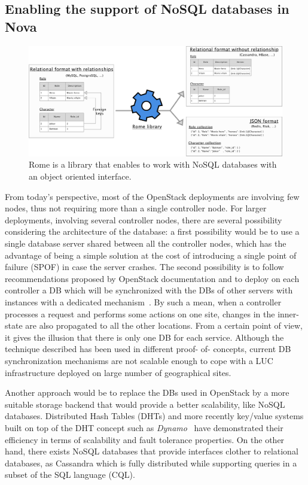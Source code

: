 \subsection{Enabling the support of NoSQL databases in Nova}

\begin{figure}
  \includegraphics[width=.99\textwidth]{figures/rome_models.pdf}
  \caption{Rome is a library that enables to work with NoSQL databases with an object oriented interface.}
  \label{fig:rome_format}
\end{figure}


From today's perspective, most of the OpenStack deployments are involving few
nodes, thus not requiring more than a single controller node. For larger
deployments, involving several controller nodes, there are several possibility
considering the architecture of the database: a first possibility would be to
use a single database server shared between all the controller nodes, which has
the advantage of being a simple solution at the cost of introducing a single
point of failure (SPOF) in case the server crashes. The second possibility is to
follow recommendations proposed by OpenStack documentation and  to deploy on
each controller a DB which will be synchronized with the DBs of other servers
with instances with a dedicated mechanism~\cite{kemme:vldb2010}. By such a mean,
when a controller processes a request and performs some actions on one site,
changes in the inner-state are also propagated to all the other locations. From
a certain point of view, it gives the illusion that there is only one DB for
each service. Although the technique described has been used in different proof-
of- concepts, current DB synchronization mechanisms are not scalable enough to
cope with a LUC infrastructure deployed on large number of geographical sites.

Another approach would be to replace the DBs used in OpenStack by a more
suitable storage backend that would provide a better scalability, like NoSQL
databases. Distributed Hash Tables (DHTs) and more recently key/value systems
built on top of the DHT concept such as \emph{Dynamo}~\cite{decandia:dynamo}
have demonstrated their efficiency in terms of scalability and fault tolerance
properties. On the other hand, there exists NoSQL databases that provide
interfaces clother to relational databases, as Cassandra which is fully
distributed while supporting queries in a subset of the SQL language (CQL).


